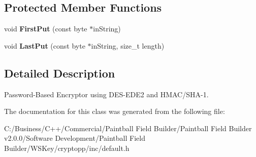 \subsection*{Protected Member Functions}
\begin{DoxyCompactItemize}
\item 
\hypertarget{class_default_encryptor_with_m_a_c_a5f8593a43875743f30d40dee6ce91abc}{
void {\bfseries FirstPut} (const byte $\ast$inString)}
\label{class_default_encryptor_with_m_a_c_a5f8593a43875743f30d40dee6ce91abc}

\item 
\hypertarget{class_default_encryptor_with_m_a_c_a15f048b97d7a5339a6f96523b613db61}{
void {\bfseries LastPut} (const byte $\ast$inString, size\_\-t length)}
\label{class_default_encryptor_with_m_a_c_a15f048b97d7a5339a6f96523b613db61}

\end{DoxyCompactItemize}


\subsection{Detailed Description}
Password-\/Based Encryptor using DES-\/EDE2 and HMAC/SHA-\/1. 

The documentation for this class was generated from the following file:\begin{DoxyCompactItemize}
\item 
C:/Business/C++/Commercial/Paintball Field Builder/Paintball Field Builder v2.0.0/Software Development/Paintball Field Builder/WSKey/cryptopp/inc/default.h\end{DoxyCompactItemize}
